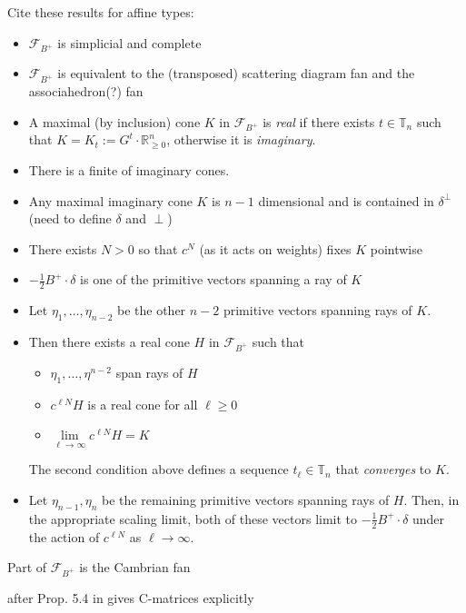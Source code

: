 \documentclass{amsart}
\numberwithin{theorem}{section}
\newcommand{\cF}{\mathcal{F}}
\newcommand{\RR}{\mathbb{R}}
\newcommand{\TT}{\mathbb{T}}
\begin{document}
  Cite these results for affine types:
  \begin{itemize}
    \item $\cF_{B^+}$ is simplicial and complete 
    \item $\cF_{B^+}$ is equivalent to the (transposed) scattering diagram fan and the associahedron(?) fan
    \item A maximal (by inclusion) cone $K$ in $\cF_{B^+}$ is \emph{real} if there exists $t\in\TT_n$ such that $K=K_t:=G^t\cdot\RR^n_{\ge0}$, otherwise it is \emph{imaginary}.
    \item There is a finite of imaginary cones.
    \item Any maximal imaginary cone $K$ is $n-1$ dimensional and is contained in $\delta^\perp$ (need to define $\delta$ and $\perp$)
    \item There exists $N>0$ so that $c^N$ (as it acts on weights) fixes $K$ pointwise
    \item $-\frac12 B^+\cdot\delta$ is one of the primitive vectors spanning a ray of $K$
    \item Let $\eta_1,\ldots,\eta_{n-2}$ be the other $n-2$ primitive vectors spanning rays of $K$.  
    \item Then there exists a real cone $H$ in $\cF_{B^+}$ such that
      \begin{itemize}
        \item $\eta_1,\ldots,\eta^{n-2}$ span rays of $H$
        \item $c^{\ell N} H$ is a real cone for all $\ell\ge0$
        \item $\lim\limits_{\ell\to\infty} c^{\ell N} H = K$
      \end{itemize}
      The second condition above defines a sequence $t_\ell\in\TT_n$ that \emph{converges} to $K$.
    \item Let $\eta_{n-1},\eta_n$ be the remaining primitive vectors spanning rays of $H$.  Then, in the appropriate scaling limit, both of these vectors limit to $-\frac12 B^+\cdot\delta$ under the action of $c^{\ell N}$ as $\ell\to\infty$.
  \end{itemize}

  Part of $\cF_{B^+}$ is the Cambrian fan
  
  after Prop. 5.4 in \cite{combinatorial_frameworks} gives C-matrices explicitly
\end{document}
